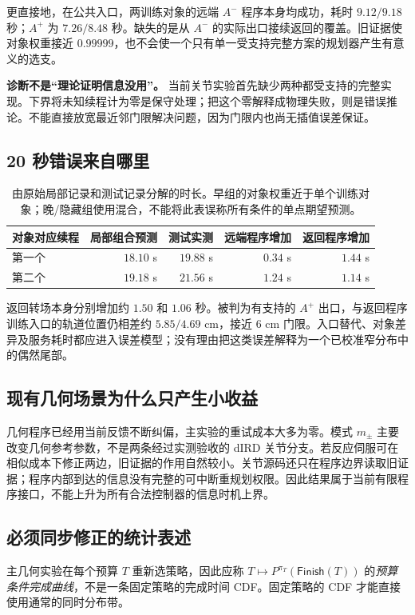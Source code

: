 \documentclass[11pt,a4paper,fontset=fandol]{ctexart}
\theoremstyle{definition}
\theoremstyle{remark}\newtheorem{remark}[theorem]{说明}
\numberwithin{equation}{section}
\newcommand{\Finish}{\mathsf{Finish}}\newcommand{\Win}{\mathsf{Win}}
\begin{document}
更直接地，在公共入口，两训练对象的远端 $A^-$ 程序本身均成功，耗时 $9.12/9.18$ 秒；$A^+$ 为 $7.26/8.48$ 秒。缺失的是从 $A^-$ 的实际出口接续返回的覆盖。旧证据使对象权重接近 $0.99999$，也不会使一个只有单一受支持完整方案的规划器产生有意义的选支\cite{jointdata}。

\begin{corebox}
\textbf{诊断不是“理论证明信息没用”。}
当前关节实验首先缺少两种都受支持的完整实现。下界将未知续程计为零是保守处理；把这个零解释成物理失败，则是错误推论。不能直接放宽最近邻门限解决问题，因为门限内也尚无插值误差保证。
\end{corebox}

\subsection{20 秒错误来自哪里}
\begin{table}[htbp]\centering\small
\begin{tabular}{lrrrr}\toprule
对象对应续程 & 局部组合预测 & 测试实测 & 远端程序增加 & 返回程序增加\\\midrule
第一个 & $18.10$ s & $19.88$ s & $0.34$ s & $1.44$ s\\
第二个 & $19.18$ s & $21.56$ s & $1.24$ s & $1.14$ s\\\bottomrule
\end{tabular}
\caption{由原始局部记录和测试记录分解的时长。早组的对象权重近于单个训练对象；晚/隐藏组使用混合，不能将此表误称所有条件的单点期望预测。}
\label{tab:timeaudit}
\end{table}
返回转场本身分别增加约 $1.50$ 和 $1.06$ 秒。被判为有支持的 $A^+$ 出口，与返回程序训练入口的轨道位置仍相差约 $5.85/4.69$ cm，接近 $6$ cm 门限。入口替代、对象差异及服务耗时都应进入误差模型；没有理由把这类误差解释为一个已校准窄分布中的偶然尾部\cite{jointcode,jointdata}。

\subsection{现有几何场景为什么只产生小收益}
几何程序已经用当前反馈不断纠偏，主实验的重试成本大多为零。模式 $m_\pm$ 主要改变几何参考参数，不是两条经过实测验收的 dIRD 关节分支。若反应伺服可在相似成本下修正两边，旧证据的作用自然较小。关节源码还只在程序边界读取旧证据；程序内部到达的信息没有完整的可中断重规划权限。因此结果属于当前有限程序接口，不能上升为所有合法控制器的信息时机上界\cite{corecode,jointcode}。

\subsection{必须同步修正的统计表述}
主几何实验在每个预算 $T$ 重新选策略，因此应称
$T\mapsto P^{\pi_T}(\Finish(T))$ 的\emph{预算条件完成曲线}，不是一条固定策略的完成时间 CDF。固定策略的 CDF 才能直接使用通常的同时分布带。
\end{document}
